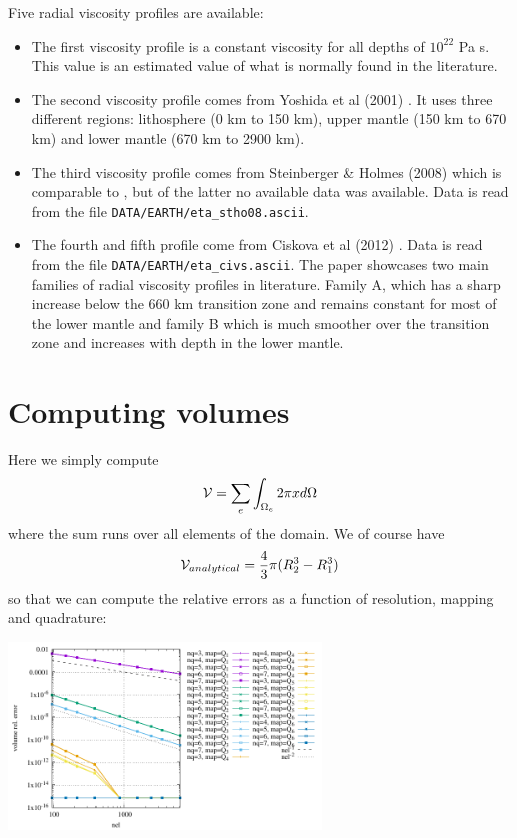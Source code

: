 Five radial viscosity profiles are available:
\begin{itemize}
\item The first viscosity profile is a constant viscosity for all depths of $10^{22}$ Pa s.  
This value is an estimated value of what is normally found in the literature. 

\item The second viscosity profile comes from Yoshida et al (2001) \cite{yohk01}. It uses three different regions: lithosphere (0 km to 150 km), upper mantle (150 km to 670 km) and lower mantle (670 km to 2900 km). 

\item The third viscosity profile comes from Steinberger \& Holmes (2008) \cite{stho08} 
which is comparable to \cite{stca06}, but of the latter no available data was available. 
Data is read from the file \texttt{DATA/EARTH/eta\_stho08.ascii}. 

\item The fourth and fifth profile come from Ciskova et al (2012) \cite{civs12}. 
Data is read from the file \texttt{DATA/EARTH/eta\_civs.ascii}. 
The paper showcases two main families of radial viscosity profiles in literature. Family A, which has a sharp 
increase below the 660 km transition zone and remains constant for most of the lower mantle 
and family B which is much smoother over the transition zone and increases with depth in the lower mantle. 

\end{itemize}




\newpage
\section*{Computing volumes}

Here we simply compute 
\[
{\cal V} = \sum_e \int_{\Omega_e} 2\pi x d\Omega
\]
where the sum runs over all elements of the domain.
We of course have 
\[
{\cal V}_{analytical} = \frac43 \pi (R_2^3-R_1^3)
\]
so that we can compute the relative errors as a function of resolution, mapping and quadrature: 
\begin{center}
\includegraphics[width=8.3cm]{python_codes/fieldstone_152/RESULTS/vols/volumes.pdf}
\end{center}

